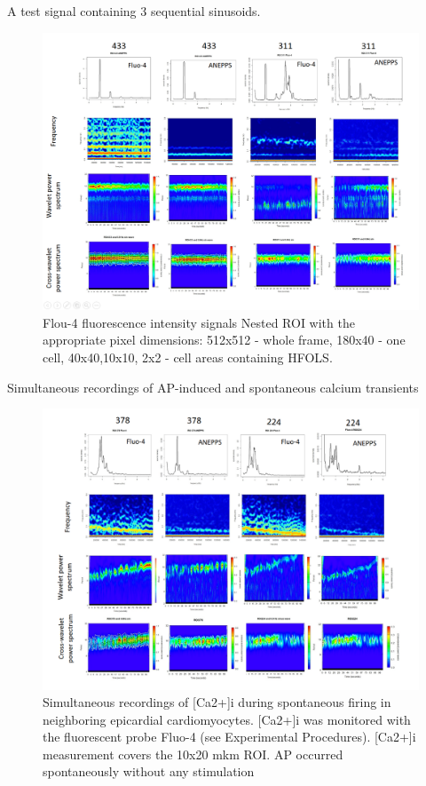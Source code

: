 \documentclass{biophys-new}
\begin{document}
A test signal containing 3 sequential sinusoids.


\begin{figure}[hbt!]
\centering
\includegraphics[width=0.9\linewidth]{fig8.png}
\caption{Flou-4 fluorescence intensity signals Nested ROI with the appropriate pixel dimensions: 512x512 - whole frame, 180x40 - one cell, 40x40,10x10, 2x2 - cell areas containing HFOLS. }
\label{fig:fig8}
\end{figure}


Simultaneous recordings of AP-induced and spontaneous calcium transients

\begin{figure}[hbt!]
\centering
\includegraphics[width=0.9\linewidth]{fig9.png}
\caption{Simultaneous recordings of [Ca2+]i during spontaneous firing in neighboring epicardial cardiomyocytes. [Ca2+]i was monitored with the fluorescent probe Fluo-4 (see Experimental Procedures). [Ca2+]i measurement covers the 10x20 mkm ROI. AP occurred spontaneously without any stimulation}
\label{fig:fig9}
\end{figure}
\end{document}
